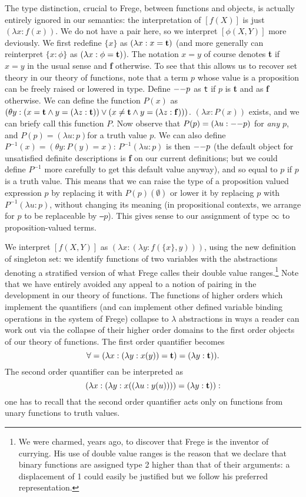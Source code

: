 \documentclass{article}
\begin{document}
{{The type distinction, crucial to Frege, between functions and objects, is actually entirely ignored in our semantics:  the interpretation of $[f(X)]$ is just $(\lambda x:f(x))$.  We do not have a pair here, so we interpret
$[\phi(X,Y)]$ more deviously.  We first redefine $\{x\}$ as $(\lambda x:x={\bf t})$ (and more generally can reinterpret $\{x :\phi\}$ as $(\lambda x:\phi={\bf t})$).  The notation $x=y$ of course denotes {\bf t} if $x=y$ in the usual sense and {\bf f} otherwise. To see that this
allows us to recover set theory in our theory of functions, note that a term $p$ whose value is a proposition can be freely raised or lowered in type.  Define ${\tt --}p$ as {\tt t} if $p$ is {\bf t} and as {\bf f} otherwise. We can define the function
$P(x)$ as $(\theta y:(x={\bf t} \wedge y=(\lambda z:{\bf t})) \vee (x\neq {\bf t} \wedge y=(\lambda z:{\bf f})))$.  $(\lambda x:P(x))$ exists, and we can briefy call this function $P$.
Now observe that $P(p) = (\lambda u:{\tt --}p)$ for {\em any \/}$p$, and $P(p) = (\lambda u:p)$for a truth value $p$.  We can also define $P^{-1}(x) = (\theta y:P(y)=x)$:  $P^{-1}(\lambda u:p)$ is then ${\tt --}p$ (the default object for unsatisfied definite descriptions is {\bf f} on our current definitions;  but we could define $P^{-1}$ more carefully to get this default value anyway), and so equal to $p$ if $p$ is a truth value.  This means
that we can raise the type of a proposition valued expression $p$ by replacing it with $P(p)(\emptyset)$ or lower it by replacing $p$ with $P^{-1}(\lambda u:p)$, without changing its meaning (in propositional contexts, we arrange for $p$ to be replaceable by {\tt --}$p$).  This gives sense to our assignment of type $\infty$ to proposition-valued terms.

We interpret
$[f(X,Y)]$ as $(\lambda x:(\lambda y:f(\{x\},y)))$, using the new definition of singleton set:  we identify functions of two variables with the abstractions denoting a stratified version of what Frege calles their double value ranges.\footnote{We were charmed, years ago, to discover that Frege is the inventor of currying.  His use of double value ranges is the reason that we declare that binary functions are assigned type 2 higher than that of their arguments:  a displacement of 1 could easily be justified but we follow his preferred representation.}  Note that we have entirely avoided any appeal to a notion of pairing in the development in our theory of functions.  The functions of higher orders which implement the quantifiers (and can implement other defined variable binding operations in the system of Frege) collapse to $\lambda$ abstractions in ways a reader can work out via the collapse of their higher order domains to the first order objects of our theory of functions.  The first order quantifier becomes $$\forall = (\lambda x:(\lambda y:x(y))={\bf t})=(\lambda y:{\bf t})).$$  The second order quantifier can be interpreted as
$$(\lambda x:(\lambda y:x((\lambda u:y(u)))) = (\lambda y:{\bf t})):$$  one has to recall that the second order quantifier acts only on functions from unary functions to truth values.

}}
\end{document}
